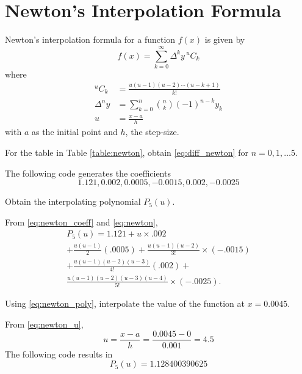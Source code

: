 \documentclass[journal,12pt,twocolumn]{IEEEtran}
\begin{document}
\section{Newton's Interpolation Formula}
\begin{theorem}
Newton's interpolation formula for a function $f(x)$ is given by \cite{newton, nptel}
\begin{equation}
\label{eq:newton}
f(x)=\sum _{k=0}^{\infty }\Delta ^{k}y \, {}^{u}C_k
\end{equation}
%
where
\begin{align}
{}^{u}C_k &=\frac{u(u-1)(u-2)\cdots (u-k+1)}{k!}
\\
\Delta ^{n}y&=\sum _{k=0}^{n}{\binom {n}{k}}(-1)^{n-k}y_k
\label{eq:diff_newton}
\\
u & = \frac{x-a}{h}
\label{eq:newton_u}
\end{align}
%
with $a$ as the initial point and $h$, the step-size.
\end{theorem}
%
%
\begin{problem}
For the table in Table \ref{table:newton}, 
obtain \eqref{eq:diff_newton} for $n = 0, 1, \dots 5$.

\end{problem}

\solution The following code generates the coefficients
\begin{equation}
\label{eq:newton_coeff}
1.121, 0.002, 0.0005, -0.0015, 0.002, -0.0025
\end{equation}

%
\begin{problem}
Obtain the interpolating polynomial $P_{5}(u)$.
\end{problem}
%
\solution  From \eqref{eq:newton_coeff} and \eqref{eq:newton},
\begin{multline}
\label{eq:newton_poly}
P_5(u) = 1.121+ u \times .002
\\
+\frac{u(u-1)}{2}(.0005) + \frac{u(u-1)(u-2)}{3!}\times (-.0015)
\\
 +\frac{u(u-1)(u-2)(u-3)}{4!}(.002)+ 
 \\
 \frac{u(u-1)(u-2)(u-3)(u-4)}{5!}
\times(-.0025).
\end{multline}
\begin{problem}
\label{prob:newton}
Using \eqref{eq:newton_poly},
interpolate the value of the function at $ x = 0.0045.$
\end{problem}
\solution From \eqref{eq:newton_u},
\begin{equation}
u = \frac{x-a}{h} = \frac{0.0045-0}{0.001} = 4.5
\end{equation}
The following code results in
\begin{equation}
P_5(u) = 1.128400390625
\end{equation}

%
\end{document}
